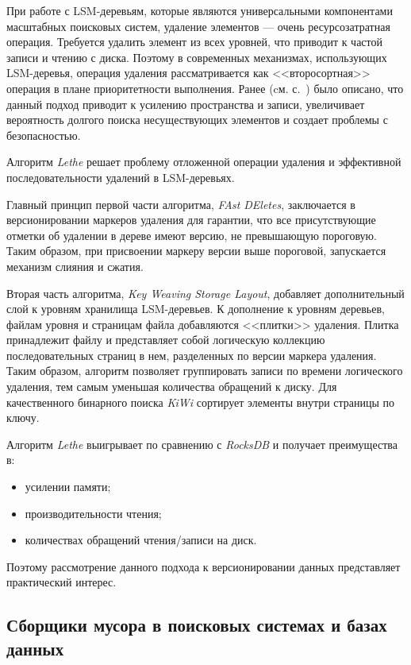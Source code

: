 При работе с LSM-деревьям, которые являются универсальными компонентами масштабных
поисковых систем, удаление элементов — очень ресурсозатратная операция. Требуется
удалить элемент из всех уровней, что приводит к частой записи и чтению с диска.
Поэтому в современных механизмах, использующих LSM-деревья, операция удаления
рассматривается как <<второсортная>> операция в плане приоритетности выполнения.
Ранее (cм. с.~\pageref{amplification}) было описано, что данный подход приводит к
усилению пространства и записи, увеличивает вероятность долгого поиска
несуществующих элементов и создает проблемы с безопасностью.

Алгоритм \textit{Lethe} \cite{Lethe:2020} решает проблему отложенной операции удаления и
эффективной последовательности удалений в LSM-деревьях. 

Главный принцип первой части алгоритма, \textit{FAst DEletes}, заключается в версионировании
маркеров удаления для гарантии, что все присутствующие отметки об удалении в
дереве имеют версию, не превышающую пороговую. Таким образом, при присвоении
маркеру версии выше пороговой, запускается механизм слияния и сжатия.

Вторая часть алгоритма, \textit{Key Weaving Storage Layout}, добавляет дополнительный
слой к уровням хранилища LSM-деревьев. К дополнение к уровням деревьев, файлам
уровня и страницам файла добавляются <<плитки>> удаления. Плитка принадлежит
файлу и представляет собой логическую коллекцию последовательных страниц в нем,
разделенных по версии маркера удаления. Таким образом, алгоритм позволяет
группировать записи по времени логического удаления, тем самым уменьшая количества
обращений к диску. Для качественного бинарного поиска \textit{KiWi} сортирует элементы
внутри страницы по ключу.

Алгоритм \textit{Lethe} выигрывает по сравнению с \textit{RocksDB} и получает преимущества в:
\begin{itemize}
    \item усилении памяти;
    \item производительности чтения;
    \item количествах обращений чтения/записи на диск.
\end{itemize}

Поэтому рассмотрение данного подхода к версионировании данных представляет
практический интерес.

\subsection{Сборщики мусора в поисковых системах и базах данных}

